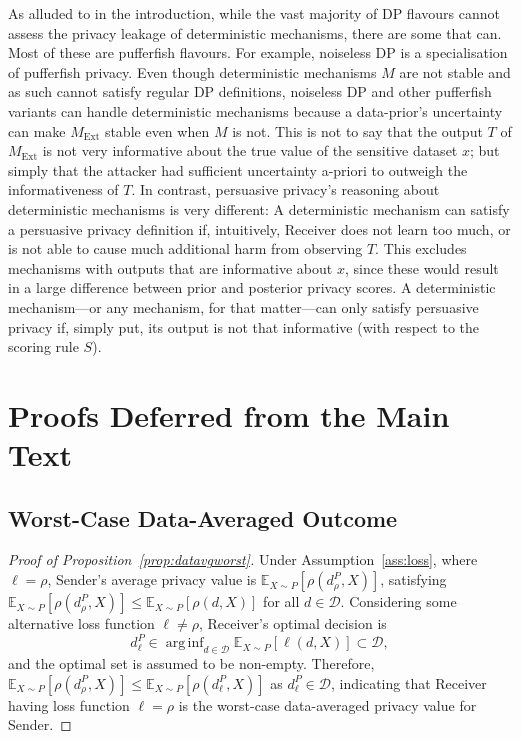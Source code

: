 \documentclass{article}
\theoremstyle{plain}
\theoremstyle{plain}
\theoremstyle{definition}
\theoremstyle{remark}
\theoremstyle{plain}
\DeclareMathOperator*{\arginf}{arg\,inf}
\newcommand{\dset}{\mathcal{D}}
\newcommand{\Mext}{M_{\mathrm{Ext}}}
\begin{document}
As alluded to in the introduction, while the vast majority of DP flavours cannot assess the privacy leakage of deterministic mechanisms, there are some that can. Most of these are pufferfish flavours. For example, noiseless DP \citep{bhaskarNoiselessDatabasePrivacy2011} is a specialisation of pufferfish privacy. Even though deterministic mechanisms $M$ are not stable and as such cannot satisfy regular DP definitions, noiseless DP and other pufferfish variants can handle deterministic mechanisms because a data-prior's uncertainty can make $\Mext$ stable even when $M$ is not. 
This is not to say that the output $T$ of $\Mext$ is not very informative about the true value of the sensitive dataset $x$; but simply that the attacker had sufficient uncertainty a-priori to outweigh the informativeness of $T$. In contrast, persuasive privacy's reasoning about deterministic mechanisms is very different: A deterministic mechanism can satisfy a persuasive privacy definition if, intuitively, Receiver does not learn too much, or is not able to cause much additional harm from observing $T$. This excludes mechanisms with outputs that are informative about $x$, since these would result in a large difference between prior and posterior privacy scores. A deterministic mechanism---or any mechanism, for that matter---can only satisfy persuasive privacy if, simply put, its output is not that informative (with respect to the scoring rule $S$). 

\section{Proofs Deferred from the Main Text}\label{app:proofs}

\subsection{Worst-Case Data-Averaged Outcome}\label{proof:datavgworst}
\begin{proof}[Proof of Proposition~\ref{prop:datavgworst}]
Under Assumption~\ref{ass:loss}, where $\ell = \rho$, Sender's average privacy value is $\mathbb{E}_{X \sim P}[ \rho(d_{\rho}^{P},X)]$, satisfying $\mathbb{E}_{X \sim P}[ \rho(d_{\rho}^{P},X)] \leq \mathbb{E}_{X \sim P}[ \rho(d,X)]$ for all $d \in \dset$.
Considering some alternative loss function $\ell \neq \rho$, Receiver's optimal decision is
\begin{equation*}
    d^P_{\ell} \in \arginf_{d \in \dset} \mathbb{E}_{X \sim P}[ \ell(d,X)] \subset \dset,
\end{equation*}
and the optimal set is assumed to be non-empty.
Therefore, 
$\mathbb{E}_{X \sim P}[ \rho(d_{\rho}^{P},X)] \leq \mathbb{E}_{X \sim P}[ \rho(d^P_\ell,X)]$ as $d^P_\ell \in \dset$,
indicating that Receiver having loss function $\ell = \rho$ is the worst-case data-averaged privacy value for Sender.
\end{proof}
\end{document}
